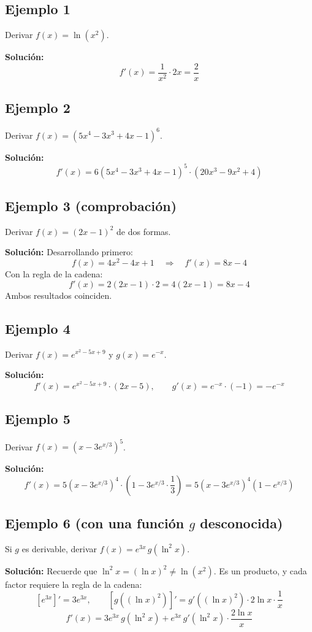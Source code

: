 \documentclass[12pt]{article}
\begin{document}
\subsection{Ejemplo 1}
Derivar $f(x) = \ln(x^2)$.

\textbf{Solución:}
\[
f'(x) = \frac{1}{x^2} \cdot 2x = \frac{2}{x}
\]

\subsection{Ejemplo 2}
Derivar $f(x) = (5x^4 - 3x^3 + 4x - 1)^6$.

\textbf{Solución:}
\[
f'(x) = 6(5x^4 - 3x^3 + 4x - 1)^5 \cdot (20x^3 - 9x^2 + 4)
\]

\subsection{Ejemplo 3 (comprobación)}
Derivar $f(x) = (2x - 1)^2$ de dos formas.

\textbf{Solución:} Desarrollando primero:
\[
f(x) = 4x^2 - 4x + 1 \quad \Rightarrow \quad f'(x) = 8x - 4
\]
Con la regla de la cadena:
\[
f'(x) = 2(2x - 1) \cdot 2 = 4(2x - 1) = 8x - 4
\]
Ambos resultados coinciden.

\subsection{Ejemplo 4}
Derivar $f(x) = e^{x^2 - 5x + 9}$ y $g(x) = e^{-x}$.

\textbf{Solución:}
\[
f'(x) = e^{x^2 - 5x + 9} \cdot (2x - 5), \qquad g'(x) = e^{-x} \cdot (-1) = -e^{-x}
\]

\subsection{Ejemplo 5}
Derivar $f(x) = \left(x - 3e^{x/3}\right)^5$.

\textbf{Solución:}
\[
f'(x) = 5\left(x - 3e^{x/3}\right)^4 \cdot \left(1 - 3e^{x/3} \cdot \frac{1}{3}\right) = 5\left(x - 3e^{x/3}\right)^4 \left(1 - e^{x/3}\right)
\]

\subsection{Ejemplo 6 (con una función $g$ desconocida)}
Si $g$ es derivable, derivar $f(x) = e^{3x} \, g(\ln^2 x)$.

\textbf{Solución:} Recuerde que $\ln^2 x = (\ln x)^2 \neq \ln(x^2)$. Es un producto, y cada factor requiere la regla de la cadena:
\[
\left[e^{3x}\right]' = 3e^{3x}, \qquad \left[g\left((\ln x)^2\right)\right]' = g'\left((\ln x)^2\right) \cdot 2\ln x \cdot \frac{1}{x}
\]
\[
f'(x) = 3e^{3x} \, g(\ln^2 x) + e^{3x} \, g'(\ln^2 x) \cdot \frac{2\ln x}{x}
\]
\end{document}
